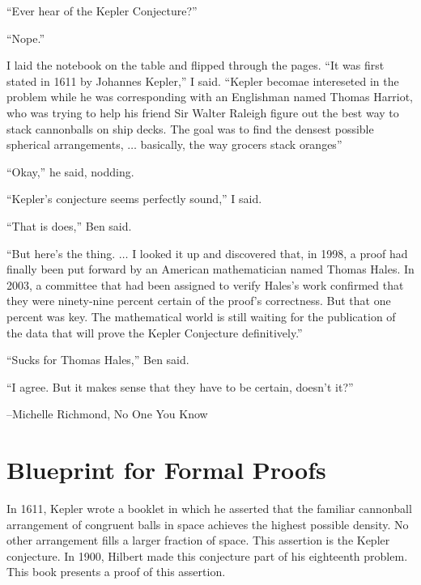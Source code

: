 {

\narrower\parindent=0pt
\baselineskip

{\it

``Ever hear of the Kepler Conjecture?''

``Nope.''

I laid the notebook on the table and flipped through the pages. ``It was first stated
in 1611 by Johannes Kepler,'' I said.  ``Kepler becomae intereseted in the problem while
he was corresponding with an Englishman named Thomas Harriot, who was trying
to help his friend Sir Walter Raleigh figure out the best way to stack cannonballs on ship
decks.  The goal was to find the densest possible spherical arrangements, $\ldots$ basically,
the way grocers stack oranges''

``Okay,'' he said, nodding.

``Kepler's conjecture {\rm{seems}} perfectly sound,'' I said.

``That is does,'' Ben said.

``But here's the thing. $\ldots$  I looked it up and discovered that, in 1998, a proof
had finally been put forward by an American mathematician named Thomas Hales.  In 2003,
a committee that had been assigned to verify Hales's work confirmed that they were ninety-nine
percent certain of the proof's correctness.  But that one percent was key.  The mathematical
world is still waiting for the publication of the data that will prove the Kepler Conjecture definitively.''

``Sucks for Thomas Hales,'' Ben said.

``I agree.  But it makes sense that they have to be certain, doesn't it?''


{\hfill--Michelle Richmond, No One You Know} %

}

}


\newpage

\section*{Blueprint for Formal Proofs}

In 1611, Kepler wrote a booklet in which he asserted that the familiar
cannonball arrangement of congruent balls in space achieves the
highest possible density.  No other arrangement fills a larger
fraction of space.  This assertion is the Kepler conjecture.  In 1900,
Hilbert made this conjecture part of his eighteenth problem.  This
book presents a proof of this assertion.

